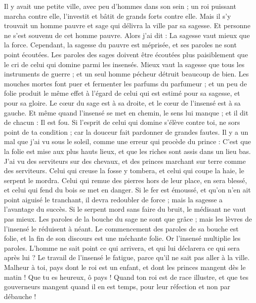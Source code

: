 \begin{multicols}{2}
Il y avait une petite ville, avec peu d'hommes dans son sein ; un roi puissant marcha contre elle, l'investit et bâtit de grands forts contre elle.
Mais il s'y trouvait un homme pauvre et sage qui délivra la ville par sa sagesse. Et personne ne s'est souvenu de cet homme pauvre.
Alors j'ai dit : La sagesse vaut mieux que la force. Cependant, la sagesse du pauvre est méprisée, et ses paroles ne sont point écoutées.
Les paroles des sages doivent être écoutées plus paisiblement que le cri de celui qui domine parmi les insensés. 
Mieux vaut la sagesse que tous les instruments de guerre ; et un seul homme pécheur détruit beaucoup de bien.
\VerseOne{} Les mouches mortes font puer et fermenter les parfums du parfumeur ; et un peu de folie produit le même effet à l'égard de celui qui est estimé pour sa sagesse, et pour sa gloire.
Le cœur du sage est à sa droite, et le cœur de l'insensé est à sa gauche.
Et même quand l'insensé se met en chemin, le sens lui manque ; et il dit de chacun : Il est fou. 
Si l'esprit de celui qui domine s'élève contre toi, ne sors point de ta condition ; car la douceur fait pardonner de grandes fautes. 
Il y a un mal que j'ai vu sous le soleil, comme une erreur qui procède du prince :
C'est que la folie est mise aux plus hauts lieux, et que les riches sont assis dans un lieu bas. 
J'ai vu des serviteurs sur des chevaux, et des princes marchant sur terre comme des serviteurs.
Celui qui creuse la fosse y tombera, et celui qui coupe la haie, le serpent le mordra.
Celui qui remue des pierres hors de leur place, en sera blessé, et celui qui fend du bois se met en danger.
Si le fer est émoussé, et qu'on n'en ait point aiguisé le tranchant, il devra redoubler de force ; mais la sagesse a l'avantage du succès.
Si le serpent mord sans faire du bruit, le médisant ne vaut pas mieux. 
Les paroles de la bouche du sage ne sont que grâce ; mais les lèvres de l'insensé le réduisent à néant.
Le commencement des paroles de sa bouche est folie, et la fin de son discours est une méchante folie.
Or l'insensé multiplie les paroles. L'homme ne sait point ce qui arrivera, et qui lui déclarera ce qui sera après lui ?
Le travail de l'insensé le fatigue, parce qu'il ne sait pas aller à la ville.
Malheur à toi, pays dont le roi est un enfant, et dont les princes mangent dès le matin !
Que tu es heureux, ô pays ! Quand ton roi est de race illustre, et que tes gouverneurs mangent quand il en est temps, pour leur réfection et non par débauche ! 

\end{multicols}
